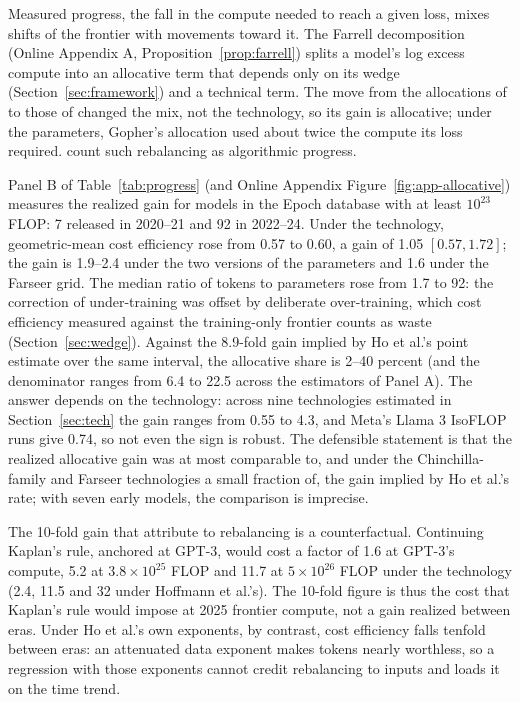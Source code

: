 Measured progress, the fall in the compute needed to reach a given loss, mixes shifts of the frontier with movements
toward it. The Farrell decomposition (Online Appendix A, Proposition~\ref{prop:farrell}) splits a model's log excess
compute into an allocative term that depends only on its wedge (Section~\ref{sec:framework}) and a technical term. The
move from the allocations of \citet{kaplan2020scaling} to those of \citet{hoffmann2022training} changed the mix, not the
technology, so its gain is allocative; under the \citet{besiroglu2024chinchilla} parameters, Gopher's allocation used
about twice the compute its loss required. \citet{gundlach2025origin} count such rebalancing as algorithmic progress.

Panel B of Table~\ref{tab:progress} (and Online Appendix Figure~\ref{fig:app-allocative}) measures the realized gain for
models in the Epoch database with at least $10^{23}$ FLOP: 7 released in 2020--21 and 92 in 2022--24. Under the \citet{besiroglu2024chinchilla} technology, geometric-mean
cost efficiency rose from 0.57 to 0.60, a gain of 1.05 $[0.57,1.72]$; the gain is 1.9--2.4 under the two versions of
the \citet{hoffmann2022training} parameters and 1.6 under the Farseer grid. The median ratio of tokens to parameters rose
from 1.7 to 92: the correction of under-training was offset by deliberate over-training, which cost efficiency measured
against the training-only frontier counts as waste (Section~\ref{sec:wedge}). Against the 8.9-fold gain implied by Ho et
al.'s point estimate over the same interval, the allocative share is 2--40 percent (and the denominator ranges from 6.4 to 22.5
across the estimators of Panel A). The answer depends on the technology: across nine technologies estimated in
Section~\ref{sec:tech} the gain ranges from 0.55 to 4.3, and Meta's Llama 3 IsoFLOP runs give 0.74, so not even the sign
is robust. The defensible statement is that the realized allocative gain was at most comparable to, and under the
Chinchilla-family and Farseer technologies a small fraction of, the gain implied by Ho et al.'s rate; with seven
early models, the comparison is imprecise.

The 10-fold gain that \citet{gundlach2025origin} attribute to rebalancing is a counterfactual. Continuing Kaplan's rule, anchored at
GPT-3, would cost a factor of 1.6 at GPT-3's compute, 5.2 at $3.8\times10^{25}$ FLOP and 11.7 at $5\times10^{26}$ FLOP
under the \citet{besiroglu2024chinchilla} technology (2.4, 11.5 and 32 under Hoffmann et al.'s). The 10-fold figure is
thus the cost that Kaplan's rule would impose at 2025 frontier compute, not a gain realized between eras. Under Ho et
al.'s own exponents, by contrast, cost efficiency falls tenfold between eras: an attenuated data exponent makes tokens
nearly worthless, so a regression with those exponents cannot credit rebalancing to inputs and loads it on the time trend.

